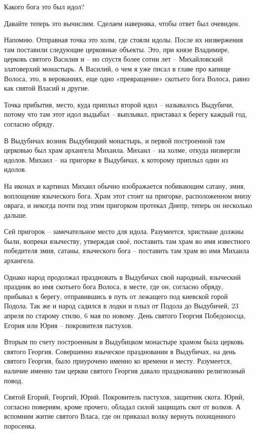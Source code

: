 Какого бога это был идол?

   Давайте теперь это вычислим. Сделаем наверняка, чтобы ответ был очевиден.

   Напомню. Отправная точка это холм, где стояли идолы. После их низвержения там поставили следующие церковные объекты. Это, при князе Владимире, церковь святого Василия и – но спустя более сотни лет – Михайловский златоверхий монастырь. А Василий, о чем я уже писал в главе про капище Волоса, это, в верованиях, еще одно «превращение» скотьего бога Волоса, равно как святой Власий и другие.

    Точка прибытия, место, куда приплыл второй идол – называлось Выдубичи, потому что там этот идол выдыбал – выплывал, приставал к берегу каждый год, согласно обряду.

   В Выдубичах возник Выдубицкий монастырь, и первой построенной там церковью был храм архангела Михаила. Михаил – на холме, откуда низвергли идолов. Михаил – на пригорке в Выдубичах, к которому приплыл один из идолов.

   На иконах и картинах Михаил обычно изображается побивающим сатану, змия, воплощение языческого бога. Храм этот стоит на пригорке, расположенном внизу оврага, и некогда почти под этим пригорком протекал Днепр, теперь он несколько дальше.

   Сей пригорок – замечательное место для идола. Разумеется, христиане должны были, вопреки язычеству, утверждая своё, поставить там храм во имя известного победителя змия, сатаны, языческого бога – поставить там храм во имя Михаила архангела.

    Однако народ продолжал праздновать в Выдубичах свой народный, языческий праздник  во имя скотьего бога Волоса, в месте, где он, согласно обряду, прибывал к берегу, отправившись в путь от лежащего под киевской горой Подола. Так же и народ садился в лодки и плыл от Подола до Выдубичей, 23 апреля по старому стилю, 6 мая по новому. День святого Георгия Победоносца, Егория или Юрия – покровителя пастухов. 

   Вторым по счету построенным в Выдубицком монастыре храмом была церковь святого Георгия. Совершенно языческое праздновании в Выдубичах, на день святого Георгия, было приурочено именно ко времени и месту. Разумеется, наличие именно там церкви святого Георгия давало празднованию религиозный повод.

   Святой Егорий, Георгий, Юрий.  Покровитель пастухов, защитник скота. Юрий, согласно повериям, кроме прочего, обладал силой защищать скот от волков. А вспомним житие святого Власа, где он приказал волку вернуть похищенного поросенка.

